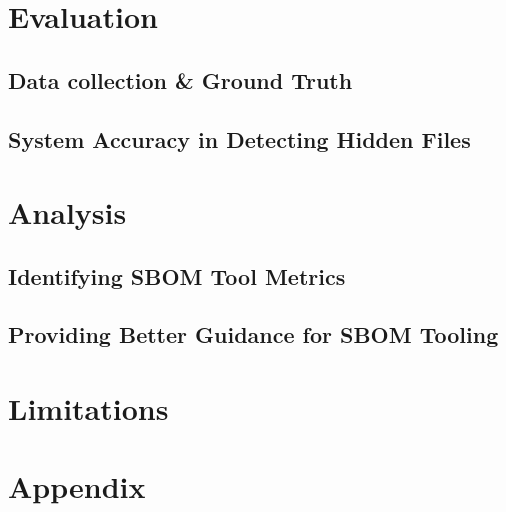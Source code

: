 \section{Evaluation}

\subsection{Data collection \& Ground Truth}

\subsection{System Accuracy in Detecting Hidden Files}




\section{Analysis}

\subsection{Identifying SBOM Tool Metrics}

\subsection{Providing Better Guidance for SBOM Tooling}



\section{Limitations}




\appendix

\section{Appendix}


